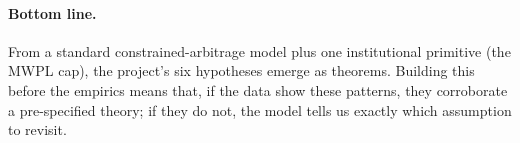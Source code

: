 \documentclass[11pt,a4paper]{article}
\theoremstyle{plain}
\theoremstyle{definition}
\theoremstyle{remark}
\begin{document}
\paragraph{Bottom line.} From a standard constrained-arbitrage model plus one institutional primitive (the MWPL cap), the project's six hypotheses emerge as theorems. Building this before the empirics means that, if the data show these patterns, they corroborate a pre-specified theory; if they do not, the model tells us exactly which assumption to revisit.
\end{document}
